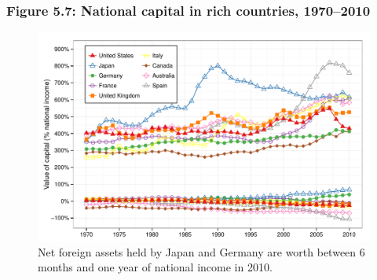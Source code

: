 \documentclass[t]{beamer}\usepackage[]{graphicx}\usepackage[]{color}
\newenvironment{knitrout}{}{} %
\begin{document}
\begin{frame}[label=Figure_5_7]
\frametitle{Figure 5.7: National capital in rich countries, 1970--2010}
\begin{figure}[t]
\begin{minipage}[b]{\textwidth}
\centering
\begin{knitrout}\footnotesize
{}\color{fgcolor}

{\centering \includegraphics[width=1\linewidth]{figures/color/Figure_5_7} 

}



\end{knitrout}
\caption{Net foreign assets held by Japan and Germany are worth between 6 months and one year of national income in 2010.}
\end{minipage}
\end{figure}
\end{frame}
\end{document}
